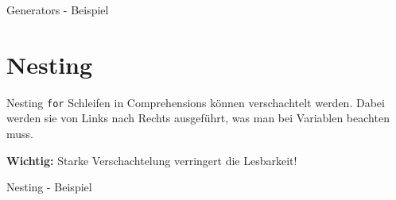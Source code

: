 \begin{frame}{Generators - Beispiel}
	
\end{frame}

\section{Nesting}
\begin{frame}{Nesting}
	\alert{\texttt{for}} Schleifen in Comprehensions können verschachtelt werden.
	Dabei werden sie von Links nach Rechts ausgeführt, was man bei Variablen beachten muss.

	\textbf{Wichtig:} Starke Verschachtelung verringert die Lesbarkeit!
\end{frame}

\begin{frame}{Nesting - Beispiel}
	
\end{frame}





